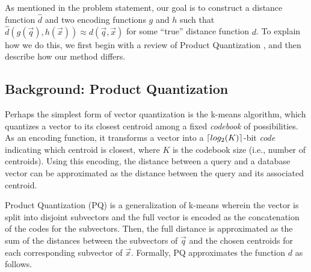 
As mentioned in the problem statement, our goal is to construct a distance function $\hat{d}$ and two encoding functions $g$ and $h$ such that $\hat{d}(g(\vec{q}), h(\vec{x})) \approx d(\vec{q}, \vec{x})$ for some ``true'' distance function $d$. To explain how we do this, we first begin with a review of Product Quantization \cite{pq}, and then describe how our method differs.

\subsection{Background: Product Quantization}

Perhaps the simplest form of vector quantization is the k-means algorithm, which quantizes a vector to its closest centroid among a fixed \textit{codebook} of possibilities. As an encoding function, it transforms a vector into a $\lceil log_2(K)\rceil$-bit \textit{code} indicating which centroid is closest, where $K$ is the codebook size (i.e., number of centroids). Using this encoding, the distance between a query and a database vector can be approximated as the distance between the query and its associated centroid.

Product Quantization (PQ) is a generalization of k-means wherein the vector is split into disjoint subvectors and the full vector is encoded as the concatenation of the codes for the subvectors. Then, the full distance is approximated as the sum of the distances between the subvectors of $\vec{q}$ and the chosen centroids for each corresponding subvector of $\vec{x}$. Formally, PQ approximates the function $d$ as follows.

